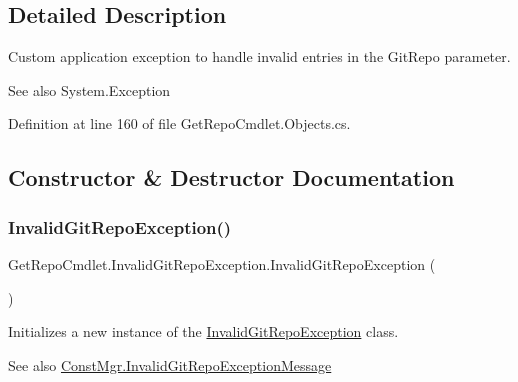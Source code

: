 \subsection{Detailed Description}
Custom application exception to handle invalid entries in the Git\+Repo parameter. 

\begin{DoxySeeAlso}{See also}
System.\+Exception


\end{DoxySeeAlso}


Definition at line 160 of file Get\+Repo\+Cmdlet.\+Objects.\+cs.



\subsection{Constructor \& Destructor Documentation}
\mbox{\label{class_get_repo_cmdlet_1_1_invalid_git_repo_exception_a806265e644c40f10548f065775b3ff6f}} 
\subsubsection{\texorpdfstring{Invalid\+Git\+Repo\+Exception()}{InvalidGitRepoException()}\hspace{0.1cm}{\footnotesize\ttfamily [1/3]}}
{\footnotesize\ttfamily Get\+Repo\+Cmdlet.\+Invalid\+Git\+Repo\+Exception.\+Invalid\+Git\+Repo\+Exception (\begin{DoxyParamCaption}{ }\end{DoxyParamCaption})}



Initializes a new instance of the \mbox{\hyperlink{class_get_repo_cmdlet_1_1_invalid_git_repo_exception}{Invalid\+Git\+Repo\+Exception}} class. 

\begin{DoxySeeAlso}{See also}
\mbox{\hyperlink{class_get_repo_cmdlet_1_1_const_mgr_a84baefdb7fb1bcd31e0148b4ce532d8f}{Const\+Mgr.\+Invalid\+Git\+Repo\+Exception\+Message}}


\end{DoxySeeAlso}


